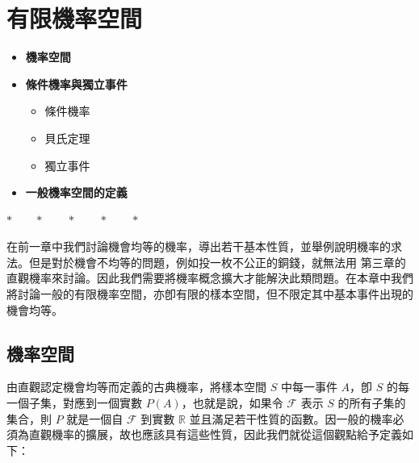 \section{有限機率空間}\label{sec:b5-ch4}

\begin{center}
\begin{minipage}{0.75\textwidth}
\begin{itemize}[leftmargin=2em, itemsep=0.3em]
  \item[§ IV-1] \textbf{機率空間}
  \item[§ IV-2] \textbf{條件機率與獨立事件}
  \begin{itemize}[leftmargin=1.5em, itemsep=0.2em]
    \item[甲、] 條件機率
    \item[乙、] 貝氏定理
    \item[丙、] 獨立事件
  \end{itemize}
  \item[附錄] \textbf{一般機率空間的定義}
\end{itemize}
\end{minipage}
\end{center}

\begin{center}
$* \qquad * \qquad * \qquad * \qquad *$
\end{center}

在前一章中我們討論機會均等的機率，導出若干基本性質，並舉例說明機率的求法。但是對於機會不均等的問題，例如投一枚不公正的銅錢，就無法用 第三章的直觀機率來討論。因此我們需要將機率概念擴大才能解決此類問題。在本章中我們將討論一般的有限機率空間，亦卽有限的樣本空間，但不限定其中基本事件出現的機會均等。

\subsection{機率空間}\label{sec:b5-4-1}
\setcounter{equation}{0}

由直觀認定機會均等而定義的古典機率，將樣本空間 $S$ 中每一事件 $A$，卽 $S$ 的每一個子集，對應到一個實數 $P(A)$，也就是說，如果令 $\mathscr{F}$ 表示 $S$ 的所有子集的集合，則 $P$ 就是一個自 $\mathscr{F}$ 到實數 $\mathbb{R}$ 並且滿足若干性質的函數。因一般的機率必須為直觀機率的擴展，故也應該具有這些性質，因此我們就從這個觀點給予定義如下：

